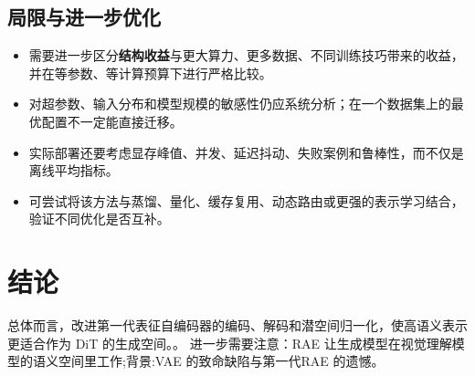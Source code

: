 \documentclass[UTF8,11pt,a4paper]{ctexart}
\newcommand{\term}[1]{\textbf{\textcolor{mainblue}{#1}}}
\begin{document}
\subsection{局限与进一步优化}
\begin{itemize}
\item 需要进一步区分\term{结构收益}与更大算力、更多数据、不同训练技巧带来的收益，并在等参数、等计算预算下进行严格比较。
\item 对超参数、输入分布和模型规模的敏感性仍应系统分析；在一个数据集上的最优配置不一定能直接迁移。
\item 实际部署还要考虑显存峰值、并发、延迟抖动、失败案例和鲁棒性，而不仅是离线平均指标。
\item 可尝试将该方法与蒸馏、量化、缓存复用、动态路由或更强的表示学习结合，验证不同优化是否互补。
\end{itemize}

\section{结论}
总体而言，改进第一代表征自编码器的编码、解码和潜空间归一化，使高语义表示更适合作为 DiT 的生成空间。。 进一步需要注意：RAE 让生成模型在视觉理解模型的语义空间里工作;背景:VAE 的致命缺陷与第一代RAE 的遗憾。
\end{document}
